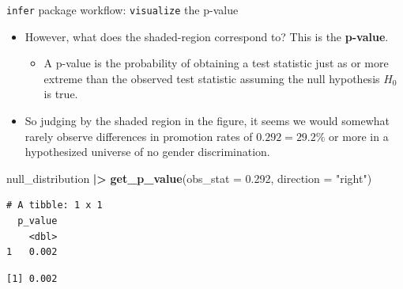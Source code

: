 \documentclass[
  ignorenonframetext,
]{beamer}
\newenvironment{Shaded}{\begin{snugshade}}{\end{snugshade}}
\newcommand{\AttributeTok}[1]{\textcolor[rgb]{0.13,0.29,0.53}{#1}}
\newcommand{\CommentTok}[1]{\textcolor[rgb]{0.56,0.35,0.01}{\textit{#1}}}
\newcommand{\FloatTok}[1]{\textcolor[rgb]{0.00,0.00,0.81}{#1}}
\newcommand{\FunctionTok}[1]{\textcolor[rgb]{0.13,0.29,0.53}{\textbf{#1}}}
\newcommand{\NormalTok}[1]{#1}
\newcommand{\SpecialCharTok}[1]{\textcolor[rgb]{0.81,0.36,0.00}{\textbf{#1}}}
\newcommand{\StringTok}[1]{\textcolor[rgb]{0.31,0.60,0.02}{#1}}
\providecommand{\tightlist}{%
  \setlength{\itemsep}{0pt}\setlength{\parskip}{0pt}}
\begin{document}
\begin{frame}[fragile]{\texttt{infer} package workflow:
\texttt{visualize} the p-value}
\protect\hypertarget{infer-package-workflow-visualize-the-p-value-1}{}
\begin{itemize}
\item
  However, what does the shaded-region correspond to? This is the
  \textbf{p-value}.

  \begin{itemize}
  \tightlist
  \item
    A p-value is the probability of obtaining a test statistic just as
    or more extreme than the observed test statistic assuming the null
    hypothesis \(H_0\) is true.
  \end{itemize}
\item
  So judging by the shaded region in the figure, it seems we would
  somewhat rarely observe differences in promotion rates of
  \(0.292 = 29.2\%\) or more in a hypothesized universe of no gender
  discrimination.
\end{itemize}

\tiny

\begin{Shaded}
\begin{Highlighting}[]
\NormalTok{null\_distribution }\SpecialCharTok{|\textgreater{}} 
  \FunctionTok{get\_p\_value}\NormalTok{(}\AttributeTok{obs\_stat =} \FloatTok{0.292}\NormalTok{, }\AttributeTok{direction =} \StringTok{"right"}\NormalTok{) }
\end{Highlighting}
\end{Shaded}

\begin{verbatim}
# A tibble: 1 x 1
  p_value
    <dbl>
1   0.002
\end{verbatim}

\begin{Shaded}
\end{Shaded}

\begin{verbatim}
[1] 0.002
\end{verbatim}

\normalsize
\end{frame}
\end{document}
